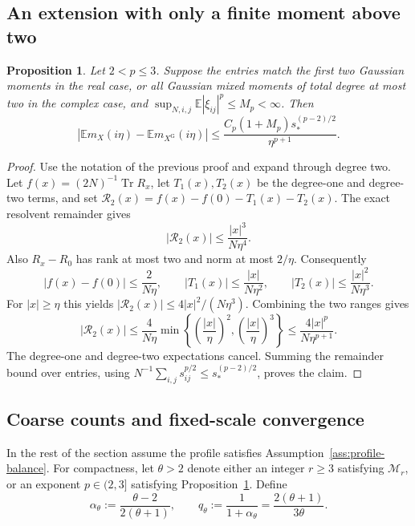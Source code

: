 \documentclass[11pt,reqno]{amsart}
\numberwithin{equation}{section}
\theoremstyle{plain}
\newtheorem{proposition}[theorem]{Proposition}
\theoremstyle{definition}
\theoremstyle{remark}
\begin{document}
\subsection{An extension with only a finite moment above two}

\begin{proposition}\label{prop:moment-fractional}
Let $2<p\le3$.  Suppose the entries match the first two Gaussian moments
in the real case, or all Gaussian mixed moments of total degree at most
two in the complex case, and
$\sup_{N,i,j}\mathbb E|\xi_{ij}|^p\le M_p<\infty$.  Then
\begin{equation}\label{eq:moment-fractional-comparison}
 \left|\mathbb Em_X(i\eta)-\mathbb Em_{X^{\mathrm G}}(i\eta)\right|
 \le\frac{C_p(1+M_p)s_*^{(p-2)/2}}{\eta^{p+1}}.
\end{equation}
\end{proposition}

\begin{proof}
Use the notation of the previous proof and expand through degree two.
Let $f(x)=(2N)^{-1}\operatorname{Tr}R_x$, let $T_1(x),T_2(x)$ be the
degree-one and degree-two terms, and set
$\mathcal R_2(x)=f(x)-f(0)-T_1(x)-T_2(x)$.  The exact resolvent
remainder gives
\[
 |\mathcal R_2(x)|\le\frac{|x|^3}{N\eta^4}.
\]
Also $R_x-R_0$ has rank at most two and norm at most $2/\eta$.
Consequently
\[
 |f(x)-f(0)|\le\frac{2}{N\eta},\qquad
 |T_1(x)|\le\frac{|x|}{N\eta^2},\qquad
 |T_2(x)|\le\frac{|x|^2}{N\eta^3}.
\]
For $|x|\ge\eta$ this yields
$|\mathcal R_2(x)|\le4|x|^2/(N\eta^3)$.  Combining the two ranges gives
\begin{equation}\label{eq:moment-interpolated-remainder}
 |\mathcal R_2(x)|
 \le\frac4{N\eta}
       \min\left\{\left(\frac{|x|}{\eta}\right)^2,
                   \left(\frac{|x|}{\eta}\right)^3\right\}
 \le\frac{4|x|^p}{N\eta^{p+1}}.
\end{equation}
The degree-one and degree-two expectations cancel.  Summing the
remainder bound over entries, using
$N^{-1}\sum_{i,j}s_{ij}^{p/2}\le s_*^{(p-2)/2}$, proves the claim.
\end{proof}

\subsection{Coarse counts and fixed-scale convergence}

In the rest of the section assume the profile satisfies
Assumption~\ref{ass:profile-balance}.  For compactness, let $\theta>2$
denote either an integer $r\ge3$ satisfying $\mathcal M_r$, or an exponent
$p\in(2,3]$ satisfying Proposition~\ref{prop:moment-fractional}.  Define
\begin{equation}\label{eq:moment-exponents}
 \alpha_\theta:=\frac{\theta-2}{2(\theta+1)},\qquad
 q_\theta:=\frac1{1+\alpha_\theta}
          =\frac{2(\theta+1)}{3\theta}.
\end{equation}
\end{document}
